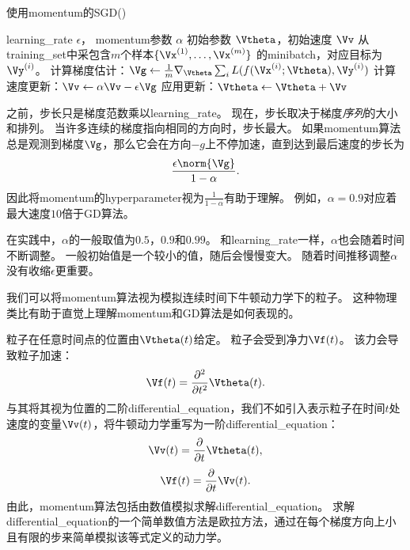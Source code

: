\begin{algorithm}[ht]
\caption{使用\gls{momentum}的\gls{SGD}()}
\label{alg:momentum}
\begin{algorithmic}
\REQUIRE \gls{learning_rate} $\epsilon$， \gls{momentum}参数 $\alpha$
\REQUIRE 初始参数 $\Vtheta$，初始速度 $\Vv$
    \STATE 从\gls{training_set}中采包含$m$个样本$\{ \Vx^{(1)},\dots, \Vx^{(m)}\}$ 的\gls{minibatch}，对应目标为$\Vy^{(i)}$。
    \STATE 计算梯度估计：$\Vg \leftarrow 
         \frac{1}{m} \nabla_{\Vtheta} \sum_i L(f(\Vx^{(i)};\Vtheta),\Vy^{(i)})$
    \STATE  计算速度更新：$\Vv \leftarrow \alpha \Vv - 
    \epsilon \Vg$
    \STATE 应用更新：$\Vtheta \leftarrow \Vtheta + \Vv$ 
\ENDWHILE
\end{algorithmic}
\end{algorithm}


之前，步长只是梯度范数乘以\gls{learning_rate}。
现在，步长取决于梯度\emph{序列}的大小和排列。
当许多连续的梯度指向相同的方向时，步长最大。
如果\gls{momentum}算法总是观测到梯度$\Vg$，那么它会在方向$-g$上不停加速，直到达到最后速度的步长为
\begin{equation}
    \frac{\epsilon \norm{\Vg}}{1-\alpha} .
\end{equation}
因此将\gls{momentum}的\gls{hyperparameter}视为$\frac{1}{1-\alpha}$有助于理解。
例如，$\alpha=0.9$对应着最大速度$10$倍于\gls{GD}算法。


在实践中，$\alpha$的一般取值为$0.5$，$0.9$和$0.99$。
和\gls{learning_rate}一样，$\alpha$也会随着时间不断调整。 
一般初始值是一个较小的值，随后会慢慢变大。
随着时间推移调整$\alpha$没有收缩$\epsilon$更重要。


我们可以将\gls{momentum}算法视为模拟连续时间下牛顿动力学下的粒子。
这种物理类比有助于直觉上理解\gls{momentum}和\gls{GD}算法是如何表现的。


粒子在任意时间点的位置由$\Vtheta(t)$给定。
粒子会受到净力$\Vf(t)$。
该力会导致粒子加速：
\begin{equation}
    \Vf(t) = \frac{\partial^2}{\partial t^2} \Vtheta(t) .
\end{equation}
与其将其视为位置的二阶\gls{differential_equation}，我们不如引入表示粒子在时间$t$处速度的变量$\Vv(t)$，将牛顿动力学重写为一阶\gls{differential_equation}：
\begin{equation}
    \Vv(t) = \frac{\partial}{\partial t} \Vtheta(t) ,
\end{equation}
\begin{equation}
    \Vf(t) = \frac{\partial}{\partial t} \Vv(t) .
\end{equation}
由此，\gls{momentum}算法包括由数值模拟求解\gls{differential_equation}。
求解\gls{differential_equation}的一个简单数值方法是欧拉方法，通过在每个梯度方向上小且有限的步来简单模拟该等式定义的动力学。


